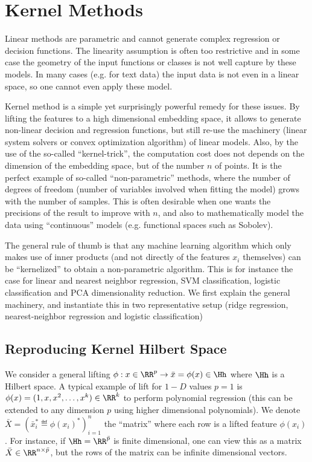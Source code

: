\section{Kernel Methods}
\label{sec-kernel-methods}

Linear methods are parametric and cannot generate complex regression or decision functions. The linearity assumption is often too restrictive and in some case the geometry of the input functions or classes is not well capture by these models.  In many cases (e.g. for text data) the input data is not even in a linear space, so one cannot even apply these model.

Kernel method is a simple yet surprisingly powerful remedy for these issues. By lifting the features to a high dimensional embedding space, it allows to generate non-linear decision and regression functions, but still re-use the machinery (linear system solvers or convex  optimization algorithm) of linear models. Also, by the use of the so-called ``kernel-trick'', the computation cost does not depends on the dimension of the embedding space, but of the number $n$ of points. It is the perfect example of so-called ``non-parametric'' methods, where the number of degrees of freedom (number of variables involved when fitting the model) grows with the number of samples. This is often desirable when one wants the precisions of the result to improve with $n$, and also to mathematically model the data using ``continuous''  models (e.g. functional spaces such as Sobolev).

The general rule of thumb is that any machine learning algorithm which only makes use of inner products (and not directly of the features $x_i$ themselves) can be ``kernelized'' to obtain a non-parametric algorithm. This is for instance the case for linear and nearest neighbor regression, SVM classification, logistic classification and PCA dimensionality reduction. We first explain the general machinery, and instantiate this in two representative setup (ridge regression, nearest-neighbor regression and logistic classification)

\subsection{Reproducing Kernel Hilbert Space}

We consider a general lifting $\phi : x \in \RR^p \rightarrow \bar x = \phi(x) \in \Hh$ where $\Hh$ is a Hilbert space. 
%
A typical example of lift for $1-D$ values $p=1$ is $\phi(x) = (1,x,x^2,\ldots,x^k) \in \RR^k$ to perform polynomial regression (this can be extended to any dimension $p$ using higher dimensional polynomials).
%
We denote $\bar X = ( \bar x_i^* \eqdef \phi(x_i)^* )_{i=1}^n$ the ``matrix'' where each row is a lifted feature $\phi(x_i)$. For instance, if $\Hh=\RR^{\bar p}$ is finite dimensional, one can view this as a matrix $\bar X \in \RR^{n \times \bar p}$, but the rows of the matrix can be infinite dimensional vectors.

